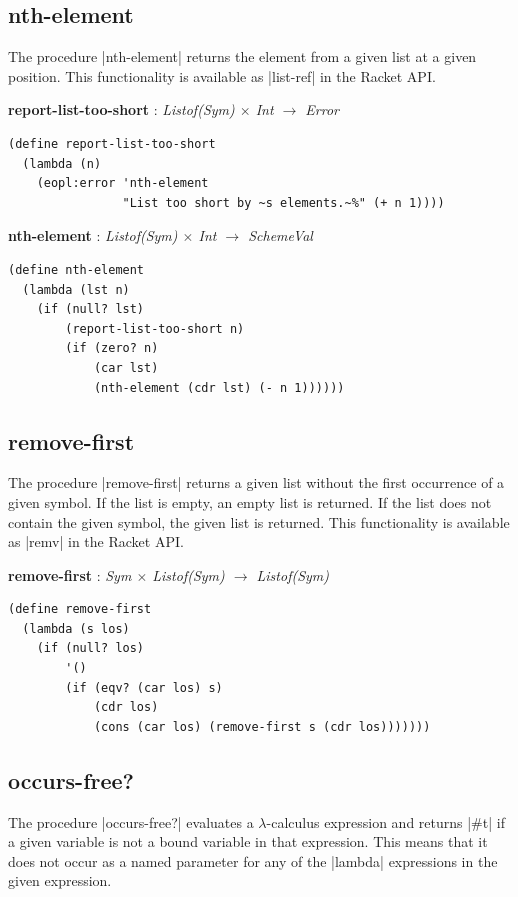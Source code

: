 \documentclass[a4paper]{article}
\begin{document}
\subsection{nth-element}

The procedure |nth-element| returns the element from a given list at a given position. This functionality is available as |list-ref| in the Racket API.

\textbf{report-list-too-short} : \textit{Listof(Sym) $\times$ Int $\rightarrow$ Error}
\begin{lstlisting}[aboveskip=0pt]
(define report-list-too-short
  (lambda (n)
    (eopl:error 'nth-element
                "List too short by ~s elements.~%" (+ n 1))))
\end{lstlisting}

\textbf{nth-element} : \textit{Listof(Sym) $\times$ Int $\rightarrow$ SchemeVal}
\begin{lstlisting}[aboveskip=0pt]
(define nth-element
  (lambda (lst n)
    (if (null? lst)
        (report-list-too-short n)
        (if (zero? n)
            (car lst)
            (nth-element (cdr lst) (- n 1))))))
\end{lstlisting}

\subsection{remove-first}

The procedure |remove-first| returns a given list without the first occurrence of a given symbol. If the list is empty, an empty list is returned. If the list does not contain the given symbol, the given list is returned. This functionality is available as |remv| in the Racket API.

\textbf{remove-first} : \textit{Sym $\times$ Listof(Sym) $\rightarrow$ Listof(Sym)}
\begin{lstlisting}[aboveskip=0pt]
(define remove-first
  (lambda (s los)
    (if (null? los)
        '()
        (if (eqv? (car los) s)
            (cdr los)
            (cons (car los) (remove-first s (cdr los)))))))
\end{lstlisting}

\subsection{occurs-free?}

The procedure |occurs-free?| evaluates a $\lambda$-calculus expression and returns |#t| if a given variable is not a bound variable in that expression. This means that it does not occur as a named parameter for any of the |lambda| expressions in the given expression.
\end{document}
